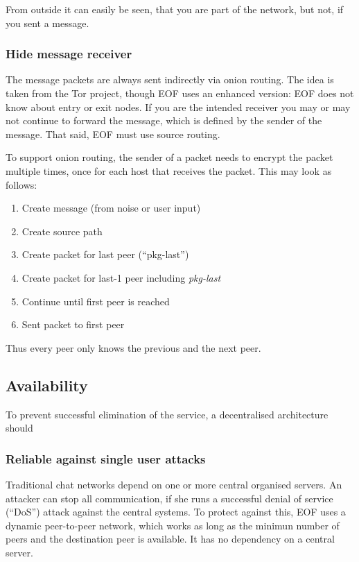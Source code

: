 From outside it can easily be seen, that you are part of the network,
but not, if you sent a message.

\subsubsection{Hide message receiver}
The message packets are always sent indirectly via onion routing\cite{onion-1}.
The idea is taken from the Tor project\cite{tor-1}, though EOF uses an enhanced
version: EOF does not know about entry or exit nodes. If you are the intended
receiver you may or may not continue to forward the message, which is defined
by the sender of the message. That said, EOF must use source 
routing\cite{source-routing-1}.

To support onion routing, the sender of a packet needs to encrypt the packet
multiple times, once for each host that receives the packet. This may look
as follows:
\begin{enumerate}
\item Create message (from noise or user input)
\item Create source path
\item Create packet for last peer ("`pkg-last"')
\item Create packet for last-1 peer including \emph{pkg-last}
\item Continue until first peer is reached
\item Sent packet to first peer 
\end{enumerate}
Thus every peer only knows the previous and the next peer.


\subsection{Availability}
To prevent
successful elimination of the service, a decentralised architecture should


\subsubsection{Reliable against single user attacks}
Traditional chat networks depend on one or more central organised servers.
An attacker can stop all communication, if she runs a successful denial
of service ("`DoS"') attack against the central systems.
To protect against this, EOF uses a dynamic peer-to-peer network, which works
as long as the minimun number of peers and the destination peer is available.
It has no dependency on a central server.

